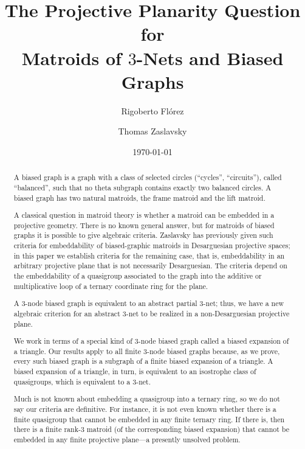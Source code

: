 \documentclass[reqno,12pt]{amsart}
\theoremstyle{remark}
\numberwithin{equation}{section}
\numberwithin{figure}{section}
\begin{document}
\thispagestyle{empty} 

\title{The Projective Planarity Question for \\ Matroids of $3$-Nets and Biased Graphs}

\author{Rigoberto Fl\'orez}
\address{The Citadel, Charleston, South Carolina 29409}

\author{Thomas Zaslavsky}
\address{Dept.\ of Mathematical Sciences, Binghamton University, Binghamton, New York 13902-6000}

\date{\today}



\begin{abstract}
A biased graph is a graph with a class of selected circles (``cycles'', ``circuits''), called ``balanced'', such that no theta subgraph contains exactly two balanced circles.  
A biased graph has two natural matroids, the frame matroid and the lift matroid.  

A classical question in matroid theory is whether a matroid can be embedded in a projective geometry.  There is no known general answer, but for matroids of biased graphs it is possible to give algebraic criteria.  Zaslavsky has previously given such criteria for embeddability of biased-graphic matroids in Desarguesian projective spaces; in this paper we establish criteria for the remaining case, that is, embeddability in an arbitrary projective plane that is not necessarily Desarguesian.  
The criteria depend on the embeddability of a quasigroup associated to the graph into the additive or multiplicative loop of a ternary coordinate ring for the plane.  

A 3-node biased graph is equivalent to an abstract partial 3-net; thus, we have a new algebraic criterion for an abstract 3-net to be realized in a non-Desarguesian projective plane.  

We work in terms of a special kind of 3-node biased graph called a biased expansion of a triangle.  Our results apply to all finite 3-node biased graphs because, as we prove, every such biased graph is a subgraph of a finite biased expansion of a triangle.  A biased expansion of a triangle, in turn, is equivalent to an isostrophe class of quasigroups, which is equivalent to a $3$-net.  

Much is not known about embedding a quasigroup into a ternary ring, so we do not say our criteria are definitive.  
For instance, it is not even known whether there is a finite quasigroup that cannot be embedded in any finite ternary ring.  If there is, then there is a finite rank-3 matroid (of the corresponding biased expansion) that cannot be embedded in any finite projective plane---a presently unsolved problem.
\end{abstract}
\end{document}
